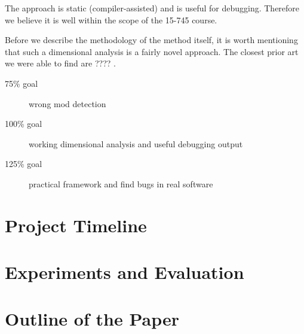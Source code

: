 \documentclass[12pt]{article}
\begin{document}
The approach is static (compiler-assisted) and is useful for debugging. Therefore we believe it is well within the scope of the 15-745 course.

Before we describe the methodology of the method itself, it is worth mentioning that such a dimensional analysis is a fairly novel approach. The closest prior art we were able to find are ???? \cite{hilfinger1988ada}. %




\begin{description}
\item [75\% goal] wrong mod detection
\item [100\% goal] working dimensional analysis and useful debugging output
\item [125\% goal] practical framework and find bugs in real software
\end{description}

\section{Project Timeline}

\section{Experiments and Evaluation}

\section{Outline of the Paper}




\end{document}
